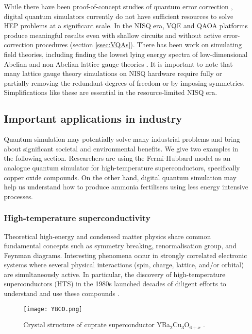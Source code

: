 \documentclass[10pt]{iopart}
\begin{document}
While there have been proof-of-concept studies of quantum error correction \cite{RyanAnderson2021,Sivak2023}, digital quantum simulators currently do not have sufficient resources to solve HEP problems at a significant scale. 
In the NISQ era, VQE and QAOA platforms produce meaningful results even with shallow circuits and without active error-correction procedures
(section \ref{ssec:VQAs}). There has been work on simulating field theories, including finding the lowest lying energy spectra of low-dimensional Abelian and non-Abelian lattice gauge theories \cite{Kokail2019,Atas2021,Irmejs2023}. It is important to note that many lattice gauge theory simulations on NISQ hardware require fully or partially removing the redundant degrees of freedom or by imposing symmetries. Simplifications like these are essential in the resource-limited NISQ era.


\subsection{Important applications in industry}

Quantum simulation may potentially solve many industrial problems and bring about significant societal and environmental benefits. We give two examples in the following section. Researchers are using the Fermi-Hubbard model as an analogue quantum simulator for high-temperature superconductors, specifically copper oxide compounds. On the other hand, digital quantum simulation may help us understand how to produce ammonia fertilisers using less energy intensive processes.


\subsubsection{High-temperature superconductivity}\hfill

Theoretical high-energy and condensed matter physics share common fundamental concepts such as symmetry breaking, renormalisation group, and Feynman diagrams. Interesting phenomena occur in strongly correlated electronic systems where several physical interactions (spin, charge, lattice, and/or orbital) are simultaneously active. In particular, the discovery of high-temperature superconductors (HTS) in the 1980s \cite{Bednorz1986,Sheng1988} launched decades of diligent efforts to understand and use these compounds \cite{Zhou2021,Lilia2022}. 

\begin{figure}[ht!]
\centering
\texttt{[image: YBCO.png]}
\caption{Crystal structure of cuprate superconductor YBa$_2$Cu$_{3}$O$_{6+x}$ \cite{Dagotto1994}.}
\label{fig:YBCO}
\end{figure}
\end{document}
